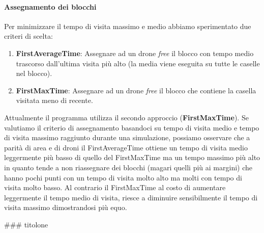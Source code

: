 \documentclass[a4paper, 11pt]{article}
\begin{document}
\paragraph*{Assegnamento dei blocchi}
Per minimizzare il tempo di visita massimo e medio abbiamo sperimentato due criteri di scelta:
\begin{enumerate}
    \item \textbf{FirstAverageTime}: Assegnare ad un drone \textit{free} il blocco con tempo medio trascorso dall'ultima visita più alto (la media viene eseguita su tutte le caselle nel blocco).
    
    \item \textbf{FirstMaxTime}: Assegnare ad un drone \textit{free} il blocco che contiene la casella visitata meno di recente.
\end{enumerate}
Attualmente il programma utilizza il secondo approccio (\textbf{FirstMaxTime}). Se valutiamo il criterio di assegnamento basandoci su tempo di visita medio e tempo di visita massimo raggiunto durante una simulazione, 
possiamo osservare che a parità di area e di droni il FirstAverageTime ottiene un tempo di visita medio leggermente più basso di quello del FirstMaxTime ma un tempo massimo più alto in quanto tende a non riassegnare dei blocchi (magari quelli più ai margini) che hanno pochi punti con un tempo di visita molto alto ma molti con tempo di visita molto basso.
Al contrario il FirstMaxTime al costo di aumentare leggermente il tempo medio di visita, riesce a diminuire sensibilmente il tempo di visita massimo dimostrandosi più equo.  

\begin{markdown}
### titolone

\end{markdown}
\end{document}
